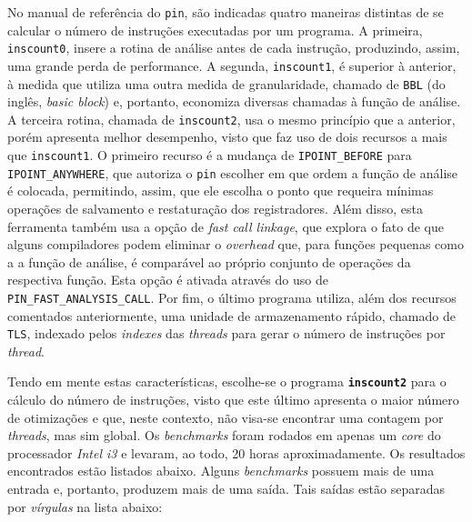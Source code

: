 \documentclass[12pt]{article}
\begin{document}
No manual de referência do \texttt{pin}, são indicadas quatro maneiras distintas
de se calcular o número de instruções executadas por um programa. A primeira,
\texttt{inscount0}, insere a rotina de análise antes de cada instrução,
produzindo, assim, uma grande perda de performance. A segunda,
\texttt{inscount1}, é superior à anterior, à medida que utiliza uma outra medida
de granularidade, chamado de \texttt{BBL} (do inglês, \textit{basic block}) e,
portanto, economiza diversas chamadas à função de análise. A terceira rotina,
chamada de \texttt{inscount2}, usa o mesmo princípio que a anterior, porém
apresenta melhor desempenho, visto que faz uso de dois recursos a mais que
\texttt{inscount1}. O primeiro recurso é a mudança de \texttt{IPOINT\_BEFORE}
para \texttt{IPOINT\_ANYWHERE}, que autoriza o \texttt{pin} escolher em que
ordem a função de análise é colocada, permitindo, assim, que ele escolha o ponto
que requeira mínimas operações de salvamento e restaturação dos registradores.
Além disso, esta ferramenta também usa a opção de \textit{fast call linkage},
que explora o fato de que alguns compiladores podem eliminar o
\textit{overhead} que, para funções pequenas como a a função de análise, é
comparável ao próprio conjunto de operações da respectiva função. Esta opção é
ativada através do uso de \texttt{PIN\_FAST\_ANALYSIS\_CALL}. Por fim, o último
programa utiliza, além dos recursos comentados anteriormente, uma unidade de
armazenamento rápido, chamado de \texttt{TLS}, indexado pelos \textit{indexes}
das \textit{threads} para gerar o número de instruções por \textit{thread}. 

Tendo em mente estas características, escolhe-se o programa
\textbf{\texttt{inscount2}} para o cálculo do número de instruções, visto que
este último apresenta o maior número de otimizações e que, neste contexto, não
visa-se encontrar uma contagem por \textit{threads}, mas sim global. Os
\textit{benchmarks} foram rodados em apenas um \textit{core} do processador
\textit{Intel i3} e levaram, ao todo, 20 horas aproximadamente. Os resultados
encontrados estão listados abaixo. Alguns \textit{benchmarks} possuem mais de
uma entrada e, portanto, produzem mais de uma saída. Tais saídas estão separadas
por \textit{vírgulas} na lista abaixo:
\end{document}
